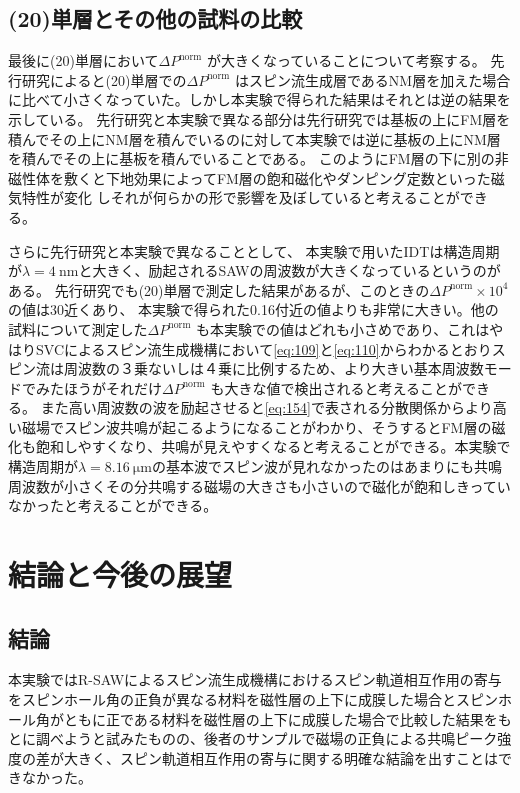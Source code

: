 \documentclass[dvipdfmx,11pt]{jsreport}
\numberwithin{equation}{chapter}
\numberwithin{table}{chapter}
\begin{document}
\section{(20)単層とその他の試料の比較}
最後に(20)単層において$\Delta P^{\text{norm}}$ が大きくなっていることについて考察する。
先行研究\cite{ku}によると(20)単層での$\Delta P^{\text{norm}}$ はスピン流生成層であるNM層を加えた場合に比べて小さくなっていた。しかし本実験で得られた結果はそれとは逆の結果を示している。
先行研究と本実験で異なる部分は先行研究では基板の上にFM層を積んでその上にNM層を積んでいるのに対して本実験では逆に基板の上にNM層を積んでその上に基板を積んでいることである。
このようにFM層の下に別の非磁性体を敷くと下地効果\cite{HAN2022164298}によってFM層の飽和磁化やダンピング定数といった磁気特性が変化
しそれが何らかの形で影響を及ぼしていると考えることができる。

さらに先行研究と本実験で異なることとして、
本実験で用いたIDTは構造周期が$\lambda=\SI{4}{\nano \metre}$と大きく、励起されるSAWの周波数が大きくなっているというのがある。
先行研究でも(20)単層で測定した結果があるが、このときの$\Delta P^{\text{norm}}\times 10^{4}$の値は30近くあり\cite{ku}、
本実験で得られた0.16付近の値よりも非常に大きい。他の試料について測定した$\Delta P^{\text{norm}}$ も本実験での値はどれも小さめであり、これはやはりSVCによるスピン流生成機構において\eqref{eq:109}と\eqref{eq:110}からわかるとおりスピン流は周波数の３乗ないしは４乗に比例するため、より大きい基本周波数モードでみたほうがそれだけ$\Delta P^{\text{norm}}$ も大きな値で検出されると考えることができる。
また高い周波数の波を励起させると\eqref{eq:154}で表される分散関係からより高い磁場でスピン波共鳴が起こるようになることがわかり、そうするとFM層の磁化も飽和しやすくなり、共鳴が見えやすくなると考えることができる。本実験で構造周期が$\lambda=\SI{8,16}{\micro \metre}$の基本波でスピン波が見れなかったのはあまりにも共鳴周波数が小さくその分共鳴する磁場の大きさも小さいので磁化が飽和しきっていなかったと考えることができる。
\chapter{結論と今後の展望}
\section{結論}
本実験ではR-SAWによるスピン流生成機構におけるスピン軌道相互作用の寄与をスピンホール角の正負が異なる材料を磁性層の上下に成膜した場合とスピンホール角がともに正である材料を磁性層の上下に成膜した場合で比較した結果をもとに調べようと試みたものの、後者のサンプルで磁場の正負による共鳴ピーク強度の差が大きく、スピン軌道相互作用の寄与に関する明確な結論を出すことはできなかった。
\end{document}
